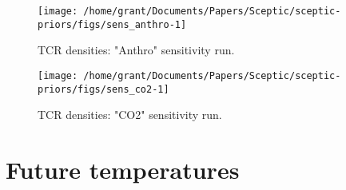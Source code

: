 \documentclass[
]{article}
\begin{document}
\begin{figure}[H]

{\centering \texttt{[image: /home/grant/Documents/Papers/Sceptic/sceptic-priors/figs/sens\_anthro-1]} 

}

\caption{TCR densities: "Anthro" sensitivity run.}\label{fig:sens_anthro}
\end{figure}

\begin{figure}[H]

{\centering \texttt{[image: /home/grant/Documents/Papers/Sceptic/sceptic-priors/figs/sens\_co2-1]} 

}

\caption{TCR densities: "CO2" sensitivity run.}\label{fig:sens_co2}
\end{figure}

\newpage
\pagebreak

\hypertarget{future-temperatures}{%
\section{Future temperatures}\label{future-temperatures}}
\end{document}
